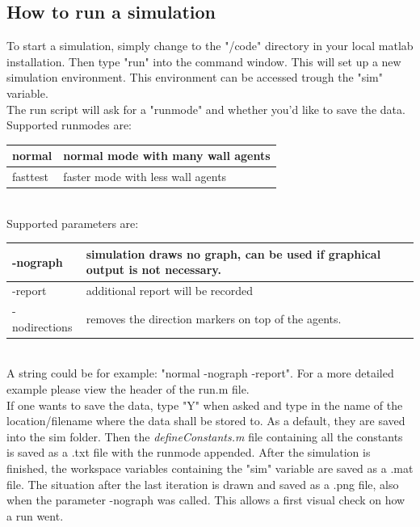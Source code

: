 \subsection{How to run a simulation}
To start a simulation, simply change to the "/code" directory in your local matlab installation. Then type "run" into the command window. This will set up a new simulation environment. This environment can be accessed trough the "sim" variable.\\
The run script will ask for a "runmode" and whether you'd like to save the data. Supported runmodes are:\\[12px]
\begin{tabular}{|p{3cm}|p{10cm}|}
      \hline
      normal & normal mode with many wall agents\\ \hline
      fasttest & faster mode with less wall agents \\ 
      \hline
\end{tabular}\\[12px]
\noi Supported parameters are:\\[12px]
\begin{tabular}{|p{3cm}|p{10cm}|}
      \hline
      -nograph & simulation draws no graph, can be used if graphical output is not necessary.\\ \hline
      -report & additional report will be recorded\\ \hline
      -nodirections & removes the direction markers on top of the agents.\\
      \hline
\end{tabular}\\[12px]
\noi A string could be for example: "normal -nograph -report". For a more detailed example please view the header of the run.m file. \\
\noi If one wants to save the data, type "Y" when asked and type in the name of the location/filename where the data shall be stored to. As a default, they are saved into the sim folder. Then the \textit{defineConstants.m} file containing all the constants is saved as a .txt file with the runmode appended. After the simulation is finished, the workspace variables containing the "sim" variable are saved as a .mat file. The situation after the last iteration is drawn and saved as a .png file, also when the parameter -nograph was called. This allows a first visual check on how a run went.
